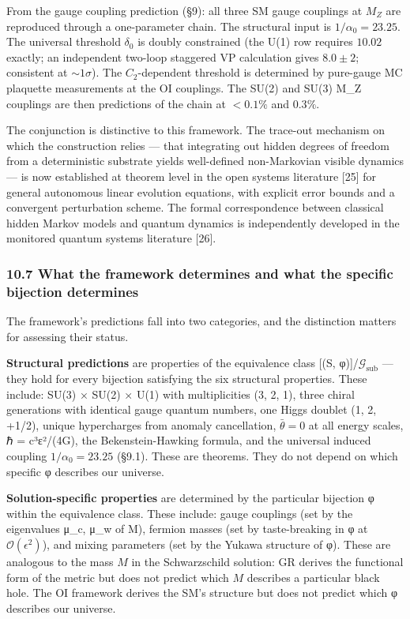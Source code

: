 \documentclass[
  11pt,
]{article}
\begin{document}
From the gauge coupling prediction (§9): all three SM gauge couplings at
\(M_Z\) are reproduced through a one-parameter chain. The structural
input is \(1/\alpha_0 = 23.25\). The universal threshold \(\delta_0\) is
doubly constrained (the U(1) row requires \(10.02\) exactly; an
independent two-loop staggered VP calculation gives \(8.0 \pm 2\);
consistent at \(\sim 1\sigma\)). The \(C_2\)-dependent threshold is
determined by pure-gauge MC plaquette measurements at the OI couplings.
The SU(2) and SU(3) M\_Z couplings are then predictions of the chain at
\(<0.1\%\) and \(0.3\%\).

The conjunction is distinctive to this framework. The trace-out
mechanism on which the construction relies --- that integrating out
hidden degrees of freedom from a deterministic substrate yields
well-defined non-Markovian visible dynamics --- is now established at
theorem level in the open systems literature {[}25{]} for general
autonomous linear evolution equations, with explicit error bounds and a
convergent perturbation scheme. The formal correspondence between
classical hidden Markov models and quantum dynamics is independently
developed in the monitored quantum systems literature {[}26{]}.

\hypertarget{what-the-framework-determines-and-what-the-specific-bijection-determines}{%
\subsubsection{10.7 What the framework determines and what the specific
bijection
determines}\label{what-the-framework-determines-and-what-the-specific-bijection-determines}}

The framework's predictions fall into two categories, and the
distinction matters for assessing their status.

\textbf{Structural predictions} are properties of the equivalence class
{[}(S, φ){]}/\(\mathcal{G}_{\text{sub}}\) --- they hold for every
bijection satisfying the six structural properties. These include: SU(3)
× SU(2) × U(1) with multiplicities (3, 2, 1), three chiral generations
with identical gauge quantum numbers, one Higgs doublet (1, 2, +1/2),
unique hypercharges from anomaly cancellation, \(\bar{\theta} = 0\) at
all energy scales, ℏ = c³ε²/(4G), the Bekenstein-Hawking formula, and
the universal induced coupling \(1/\alpha_0 = 23.25\) (§9.1). These are
theorems. They do not depend on which specific φ describes our universe.

\textbf{Solution-specific properties} are determined by the particular
bijection φ within the equivalence class. These include: gauge couplings
(set by the eigenvalues μ\_c, μ\_w of M), fermion masses (set by
taste-breaking in φ at \(\mathcal{O}(\epsilon^2)\)), and mixing
parameters (set by the Yukawa structure of φ). These are analogous to
the mass \(M\) in the Schwarzschild solution: GR derives the functional
form of the metric but does not predict which \(M\) describes a
particular black hole. The OI framework derives the SM's structure but
does not predict which φ describes our universe.
\end{document}
